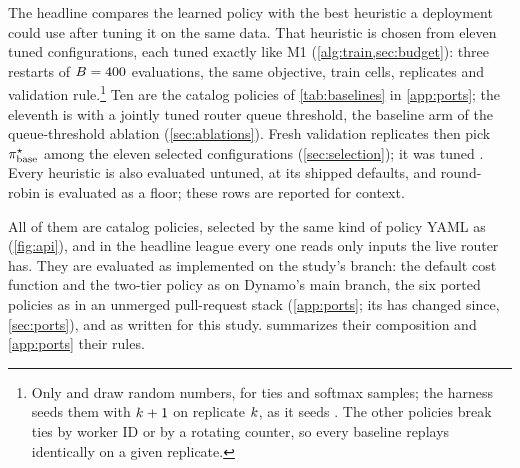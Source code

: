 The headline compares the learned policy with the best heuristic a deployment could use after
tuning it on the same data. That heuristic is chosen from eleven tuned configurations, each tuned
exactly like M1 (\cref{alg:train,sec:budget}): three restarts of $B = 400$ evaluations, the
same objective, train cells, replicates and validation rule.\footnote{Only  and
   draw random numbers, for ties and softmax samples; the harness seeds them
  with $k + 1$ on replicate $k$, as it seeds \lc{}. The other policies break ties by worker
  ID or by a rotating counter, so every baseline replays identically on a given replicate.}
Ten are the catalog policies of \cref{tab:baselines} in \cref{app:ports}; the eleventh is  with a jointly
tuned router queue threshold, the baseline arm of the queue-threshold ablation (\cref{sec:ablations}).
Fresh validation replicates then pick $\pi^{\star}_{\mathrm{base}}$ among the eleven selected configurations
(\cref{sec:selection}); it was tuned . Every heuristic is also evaluated untuned, at
its shipped defaults, and round-robin is evaluated as a floor; these rows are reported for context.

All of them are catalog policies, selected by the same kind of policy YAML as \lc{}
(\cref{fig:api}), and in the headline league every one reads only inputs the live router has. They
are evaluated as implemented on the study's branch: the default cost function and the two-tier
policy as on Dynamo's main branch, the six ported policies as in an unmerged pull-request stack
(\cref{app:ports}; its  has changed since, \cref{sec:ports}), and
 as written for this study.  summarizes their
composition and \cref{app:ports} their rules.


